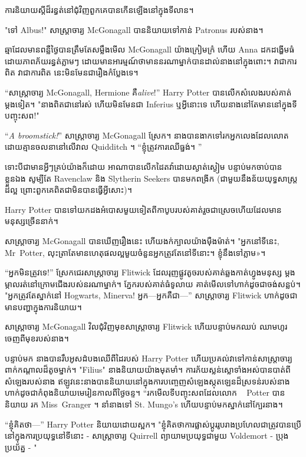 {{ការនិយាយស្តីដ៏រន្ធត់នៅជុំវិញពួកគេបានកើនឡើងនៅក្នុងទីលាន។

"ទៅ Albus!" សាស្រ្តាចារ្យ McGonagall បាននិយាយទៅកាន់ Patronus របស់នាង។

ឆ្មាដែលមានពន្លឺថ្ងៃបានត្រឹមតែសម្លឹងមើល McGonagall យ៉ាងក្រៀមក្រំ ហើយ Anna ដកដង្ហើមធំដោយភាពភ័យរន្ធត់ភ្លាមៗ ដោយមានអារម្មណ៍ថាមាននរណាម្នាក់បានដាល់នាងនៅក្នុងពោះ។ វាជាការពិត វាជាការពិត នេះមិនមែនជារឿងកំប្លែងទេ។

“សាស្រ្តាចារ្យ McGonagall, Hermione គឺ\emph{alive}!” Harry Potter បានលើកសំលេងរបស់គាត់ម្តងទៀត។ "នាងពិតជានៅរស់ ហើយមិនមែនជា Inferius ឬអ្វីនោះទេ ហើយនាងនៅតែមាននៅក្នុងទីបញ្ចុះសព!"

“\emph{A broomstick!}” សាស្ត្រាចារ្យ McGonagall ស្រែក។ នាងបានងាកទៅរកអ្នកលេងដែលលោតដោយគ្មានចលនានៅលើវាល Quidditch ។ “ខ្ញុំ​ត្រូវ​ការ​ឈើ​ធ្នង់។ ”

ទោះបីជាមានអ្វីៗគ្រប់យ៉ាងក៏ដោយ អាណាបានលើកដៃតវ៉ាដោយស្ងាត់ស្ងៀម បន្ទាប់មកចាប់បានខ្លួនឯង សូម្បីតែ Ravenclaw និង Slytherin Seekers បានមកពង្រីក (ជាមួយនឹងន័យយុទ្ធសាស្ត្រដ៏ល្អ ព្រោះពួកគេពិតជាមិនបានធ្វើអ្វីសោះ)។

Harry Potter បាន​ទៅ​យក​ដង​អំបោស​មួយ​ទៀត​ពី​កាបូប​របស់​គាត់​រួច​ជា​ស្រេច​ហើយ​ដែល​មាន​មនុស្ស​ច្រើន​នាក់។

សាស្រ្តាចារ្យ McGonagall បានឃើញរឿងនេះ ហើយងក់ក្បាលយ៉ាងម៉ឺងម៉ាត់។ "អ្នកនៅទីនេះ, Mr~Potter, លុះត្រាតែមានហេតុផលល្អមួយចំនួនអ្នកត្រូវតែនៅទីនោះ។ ខ្ញុំ​នឹង​ទៅ​ភ្លាម»។

“អ្នកមិនត្រូវទេ!” ស្រែកជេរសាស្ត្រាចារ្យ Flitwick ដែលរុញផ្លូវតូចរបស់គាត់ឆ្លងកាត់ហ្វូងមនុស្ស ម្តងម្កាលរត់នៅក្រោមជើងរបស់នរណាម្នាក់។ ភ្នែករបស់គាត់ធំទូលាយ គាត់មើលទៅហាក់ដូចជាចង់សន្លប់។ "អ្នកត្រូវតែស្នាក់នៅ Hogwarts, Minerva! អ្នក—អ្នកគឺជា—” សាស្ត្រាចារ្យ Flitwick ហាក់ដូចជាមានបញ្ហាក្នុងការនិយាយ។

សាស្ត្រាចារ្យ McGonagall វិលជុំវិញមុខសាស្ត្រាចារ្យ Flitwick ហើយបន្ទាប់មកឈប់ ឈាមហូរចេញពីមុខរបស់នាង។

បន្ទាប់មក នាង​បាន​រឹបអូស​ដំបង​ឈើ​ពី​ដៃ​របស់ Harry Potter ហើយ​ប្រគល់​វា​ទៅ​កាន់​សាស្ត្រាចារ្យ​ពាក់កណ្ដាល​ដ៏តូច​ម្នាក់។ "Filius" នាងនិយាយយ៉ាងមុតមាំ។ ការភ័យស្លន់ស្លោទាំងអស់បានបាត់ពីសំឡេងរបស់នាង ឥឡូវនេះនាងបាននិយាយនៅក្នុងការបញ្ចេញសំឡេងស្កុតឡេនដ៏ស្រទន់របស់នាង ហាក់ដូចជាកំពុងនិយាយមេរៀនកាលពីថ្ងៃចន្ទ។ “រកមើលទីបញ្ចុះសពដែលលោក ~ Potter បាននិយាយ រក Miss~Granger ។ នាំនាងទៅ St. Mungo's ហើយបន្ទាប់មកស្នាក់នៅក្បែរនាង។

“ខ្ញុំគិតថា—” Harry Potter និយាយដោយស្អក។ "ខ្ញុំគិតថាការផ្លាស់ប្តូររូបរាងប្រហែលជាត្រូវបានប្រើនៅក្នុងការប្រយុទ្ធនៅទីនោះ - សាស្រ្តាចារ្យ Quirrell ព្យាយាមប្រយុទ្ធជាមួយ Voldemort - ប្រុងប្រយ័ត្ន - "

}}
